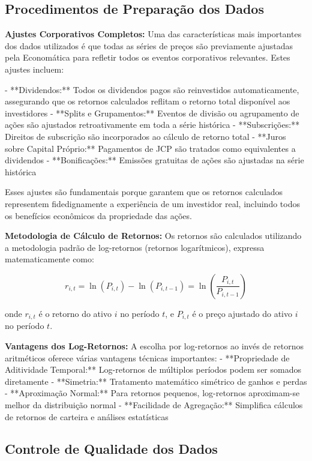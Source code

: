 \subsection{Procedimentos de Preparação dos Dados}

\textbf{Ajustes Corporativos Completos:} Uma das características mais importantes dos dados utilizados é que todas as séries de preços são previamente ajustadas pela Economática para refletir todos os eventos corporativos relevantes. Estes ajustes incluem:

- **Dividendos:** Todos os dividendos pagos são reinvestidos automaticamente, assegurando que os retornos calculados reflitam o retorno total disponível aos investidores
- **Splits e Grupamentos:** Eventos de divisão ou agrupamento de ações são ajustados retroativamente em toda a série histórica
- **Subscrições:** Direitos de subscrição são incorporados ao cálculo de retorno total
- **Juros sobre Capital Próprio:** Pagamentos de JCP são tratados como equivalentes a dividendos
- **Bonificações:** Emissões gratuitas de ações são ajustadas na série histórica

Esses ajustes são fundamentais porque garantem que os retornos calculados representem fidedignamente a experiência de um investidor real, incluindo todos os benefícios econômicos da propriedade das ações.

\textbf{Metodologia de Cálculo de Retornos:} Os retornos são calculados utilizando a metodologia padrão de log-retornos (retornos logarítmicos), expressa matematicamente como:

\begin{equation}
r_{i,t} = \ln(P_{i,t}) - \ln(P_{i,t-1}) = \ln\left(\frac{P_{i,t}}{P_{i,t-1}}\right)
\end{equation}

onde $r_{i,t}$ é o retorno do ativo $i$ no período $t$, e $P_{i,t}$ é o preço ajustado do ativo $i$ no período $t$.

\textbf{Vantagens dos Log-Retornos:} A escolha por log-retornos ao invés de retornos aritméticos oferece várias vantagens técnicas importantes:
- **Propriedade de Aditividade Temporal:** Log-retornos de múltiplos períodos podem ser somados diretamente
- **Simetria:** Tratamento matemático simétrico de ganhos e perdas
- **Aproximação Normal:** Para retornos pequenos, log-retornos aproximam-se melhor da distribuição normal
- **Facilidade de Agregação:** Simplifica cálculos de retornos de carteira e análises estatísticas

\subsection{Controle de Qualidade dos Dados}

